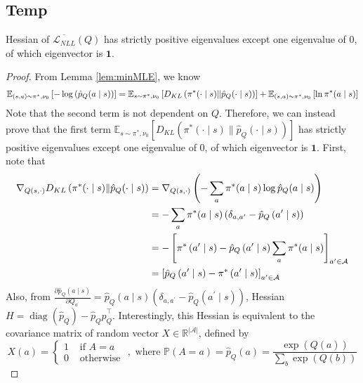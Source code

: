 \subsection{Temp}

\begin{lem}\label{lem:NLLnearstrongconv} Hessian of $\overline{\mathcal{L}_{NLL}}(Q)$ has strictly positive eigenvalues except one eigenvalue of 0, of which eigenvector is $\mathbf{1}$. 

    
\end{lem}
\begin{proof}
From Lemma \ref{lem:minMLE}, we know
\begin{align}
\mathbb{E}_{(s, a) \sim \pi^*, \nu_0}\left[-\log \left(\hat{p}_Q(a \mid s)\right)\right] =\mathbb{E}_{s \sim \pi^*, \nu_0}\left[D_{K L}\left(\pi^*(\cdot \mid s) \| \hat{p}_Q(\cdot \mid s)\right)\right]+\mathbb{E}_{(s, a) \sim \pi^*, \nu_0}\left[\ln \pi^*(a \mid s)\right] \notag
\end{align}
Note that the second term is not dependent on $Q$. Therefore, we can instead prove that the first term $\mathbb{E}_{s \sim \pi^*, \nu_0}\left[D_{K L}\left(\pi^*(\cdot \mid s) \| \hat{p}_Q(\cdot \mid s)\right)\right]$ has strictly positive eigenvalues except one eigenvalue of 0, of which eigenvector is $\mathbf{1}$. First, note that
\begin{align}
     \nabla_{Q(s, \cdot)}D_{K L}\left(\pi^*(\cdot \mid s) \| \hat{p}_Q(\cdot \mid s)\right)&= \nabla_{Q(s, \cdot)}\left(-\sum_a \pi^*(a \mid s) \log \hat{p}_Q(a \mid s)\right) \notag
     \\
     &=-\sum_a \pi^*(a \mid s)\left(\delta_{a, a^{\prime}}-\hat{p}_Q\left(a^{\prime} \mid s\right)\right)\notag
     \\
     &=-\left[\pi^*\left(a^{\prime} \mid s\right)-\hat{p}_Q\left(a^{\prime} \mid s\right) \sum_a \pi^*(a \mid s)\right]_{a^{\prime} \in \mathcal{A}}\notag
     \\
     &=\left[\hat{p}_Q\left(a^{\prime} \mid s\right)-\pi^*\left(a^{\prime} \mid s\right)\right]_{a^{\prime} \in \mathcal{A}} \notag
\end{align}
Also, from $\frac{\partial \hat{p}_Q(a\mid s)}{\partial Q_{a^{\prime}}}=\hat{p}_Q(a\mid s)\left(\delta_{a, a^{\prime}}-\hat{p}_Q\left(a^{\prime}\mid s\right)\right)$, Hessian $H=\operatorname{diag}\left(\hat{p}_Q\right)-\hat{p}_Q \hat{p}_Q^{\top}$. Interestingly, this Hessian is equivalent to the covariance matrix of random vector $X \in \mathbb{R}^{|\mathcal{A}|}$, defined by $$X(a)= \begin{cases}1 & \text { if } A=a \\ 0 & \text { otherwise }\end{cases}, \text{ where } \mathbb{P}(A=a)=\hat{p}_Q(a)=\frac{\exp (Q(a))}{\sum_b \exp (Q(b))}$$

\end{proof}
